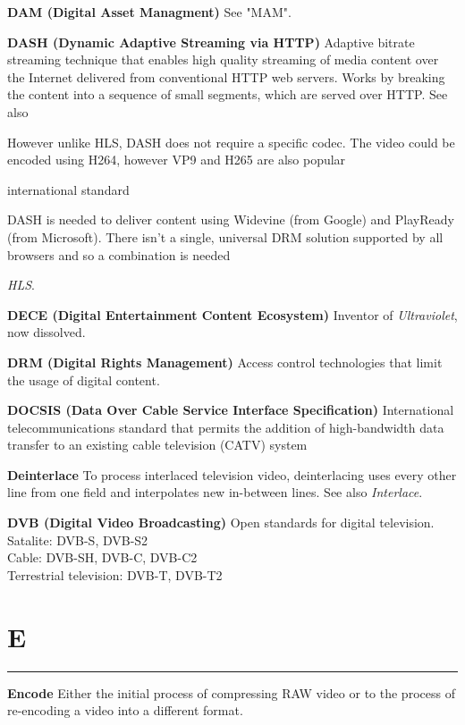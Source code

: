 \smallskip
\textbf{DAM (Digital Asset Managment)}
See "MAM".

\smallskip
\textbf{DASH (Dynamic Adaptive Streaming via HTTP)}
Adaptive bitrate streaming technique that enables high quality streaming of media content over the Internet delivered from conventional HTTP web servers. Works by breaking the content into a sequence of small segments, which are served over HTTP. See also

However unlike HLS, DASH does not require a specific codec. The video could be encoded using H264, however VP9 and H265 are also popular

international standard

DASH is needed to deliver content using Widevine (from Google) and PlayReady (from Microsoft). There isn’t a single, universal DRM solution supported by all browsers and so a combination is needed

\textit{HLS}.

\smallskip
\textbf{DECE (Digital Entertainment Content Ecosystem)}
Inventor of \textit{Ultraviolet}, now dissolved.

\smallskip
\textbf{DRM (Digital Rights Management)}
Access control technologies that limit the usage of digital content.

\smallskip
\textbf{DOCSIS (Data Over Cable Service Interface Specification)}
International telecommunications standard that permits the addition of high-bandwidth data transfer to an existing cable television (CATV) system

\smallskip
\textbf{Deinterlace}
To process interlaced television video, deinterlacing uses every other line from one field and interpolates new in-between lines. See also \textit{Interlace}.

\smallskip
\textbf{DVB (Digital Video Broadcasting)}
Open standards for digital television.\\
Satalite: DVB-S, DVB-S2\\
Cable: DVB-SH, DVB-C, DVB-C2\\
Terrestrial television: DVB-T, DVB-T2

\section{E}
\hrule

\medskip
\textbf{Encode}
Either the initial process of compressing RAW video or to the process of re-encoding a video into a different format.

